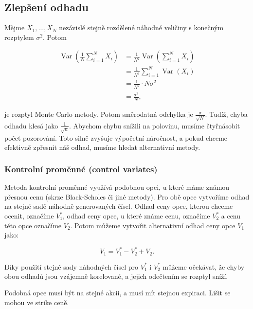 \documentclass{article}
\begin{document}
\subsection{Zlepšení odhadu}

Mějme $X_1, \dots, X_N$ nezávislé stejně rozdělené náhodné veličiny s konečným rozptylem $\sigma^2$. Potom

\[
\begin{aligned}
\operatorname{Var}\!\left( \frac{1}{N}\sum_{i=1}^N X_i \right)
&= \frac{1}{N^2} \operatorname{Var}\!\left( \sum_{i=1}^N X_i \right) \\
&= \frac{1}{N^2} \sum_{i=1}^N \operatorname{Var}(X_i) \\
&= \frac{1}{N^2} \cdot N \sigma^2 \\
&= \frac{\sigma^2}{N},
\end{aligned}
\]

je rozptyl Monte Carlo metody. Potom směrodatná odchylka je $\frac{\sigma}{\sqrt{N}}$. Tudíž, chyba odhadu klesá jako $\frac{1}{\sqrt{n}}$. Abychom chybu snížili na polovinu, musíme čtyřnásobit počet pozorování. Toto silně zvyšuje výpočetní náročnost, a pokud chceme efektivně zpřesnit náš odhad, musíme hledat alternativní metody.

\citep{Boyle1986}

\subsubsection{Kontrolní proměnné (control variates)}

Metoda kontrolní proměnné využívá podobnou opci, u které máme známou přesnou cenu (skrze Black-Scholes či jiné metody).
Pro obě opce vytvoříme odhad na stejné sadě náhodně generovaných čísel. Odhad ceny opce, kterou chceme ocenit, označíme $V_1^*$, odhad ceny opce, u které známe cenu, označíme $V_2^*$ a cenu této opce označíme $V_2$. Potom můžeme vytvořit alternativní odhad ceny opce $V_1$ jako:

\begin{equation}
  V_1 = V_1^* - V_2^* + V_2.
\end{equation}

Díky použití stejné sady náhodných čísel pro $V_1^*$ i $V_2^*$ můžeme očekávat, že chyby obou odhadů jsou vzájemně korelované, a jejich odečtením se rozptyl sníží.

\citep[Kapitola~80.13.2]{Wilmott2006}

Podobná opce musí být na stejné akcii, a musí mít stejnou expiraci. Lišit se mohou ve strike ceně.
\end{document}
